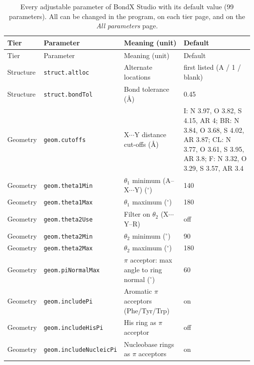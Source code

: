 \documentclass[journal=jcisd8,manuscript=suppinfo]{achemso}
\newcommand{\BX}{BondX Studio}
\begin{document}
\begin{singlespace}
{\scriptsize
\setlength{\tabcolsep}{3pt}
\begin{longtable}{llp{4.2cm}l}
\caption{Every adjustable parameter of \BX{} with its default value (99 parameters). All can be changed in the program, on each tier page, and on the \emph{All parameters} page.}\label{tab:params}\\
\toprule
Tier & Parameter & Meaning (unit) & Default\\
\midrule
\endfirsthead
\toprule
Tier & Parameter & Meaning (unit) & Default\\
\midrule
\endhead
\bottomrule
\endlastfoot
Structure & \texttt{struct.altloc} & Alternate locations & \parbox[t]{5.0cm}{\raggedright first listed (A / 1 / blank)}\\
Structure & \texttt{struct.bondTol} & Bond tolerance (\AA{}) & \parbox[t]{5.0cm}{\raggedright 0.45}\\
Geometry & \texttt{geom.cutoffs} & X$\cdots$Y distance cut-offs (\AA{}) & \parbox[t]{5.0cm}{\raggedright I: N 3.97, O 3.82, S 4.15, AR 4; BR: N 3.84, O 3.68, S 4.02, AR 3.87; CL: N 3.77, O 3.61, S 3.95, AR 3.8; F: N 3.32, O 3.29, S 3.57, AR 3.4}\\
Geometry & \texttt{geom.theta1Min} & $\theta_1$ minimum (A--X$\cdots$Y) ($^\circ$) & \parbox[t]{5.0cm}{\raggedright 140}\\
Geometry & \texttt{geom.theta1Max} & $\theta_1$ maximum ($^\circ$) & \parbox[t]{5.0cm}{\raggedright 180}\\
Geometry & \texttt{geom.theta2Use} & Filter on $\theta_2$ (X$\cdots$Y--R) & \parbox[t]{5.0cm}{\raggedright off}\\
Geometry & \texttt{geom.theta2Min} & $\theta_2$ minimum ($^\circ$) & \parbox[t]{5.0cm}{\raggedright 90}\\
Geometry & \texttt{geom.theta2Max} & $\theta_2$ maximum ($^\circ$) & \parbox[t]{5.0cm}{\raggedright 180}\\
Geometry & \texttt{geom.piNormalMax} & $\pi$ acceptor: max angle to ring normal ($^\circ$) & \parbox[t]{5.0cm}{\raggedright 60}\\
Geometry & \texttt{geom.includePi} & Aromatic $\pi$ acceptors (Phe/Tyr/Trp) & \parbox[t]{5.0cm}{\raggedright on}\\
Geometry & \texttt{geom.includeHisPi} & His ring as $\pi$ acceptor & \parbox[t]{5.0cm}{\raggedright off}\\
Geometry & \texttt{geom.includeNucleicPi} & Nucleobase rings as $\pi$ acceptors & \parbox[t]{5.0cm}{\raggedright on}\\

\end{longtable}}
\end{singlespace}
\end{document}
